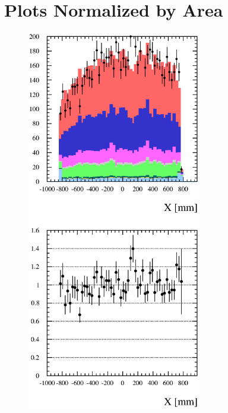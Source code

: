 
\section{Plots Normalized by Area}

\begin{figure}[h]
  \centering
  \includegraphics[width=3in]{Figures/P0DTrkXRun1Run2-normByRatio.eps}

\end{figure}
